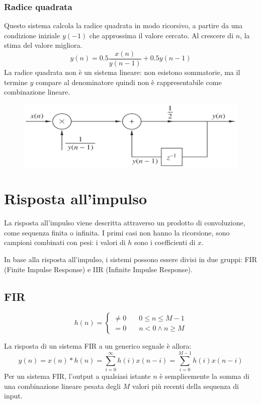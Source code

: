 \newpage
\subsubsection{Radice quadrata}
Questo sistema calcola la radice quadrata in modo ricorsivo, a partire da una condizione iniziale $y(-1)$ che approssima il valore cercato. Al crescere di $n$, la stima del valore migliora.
$$y(n) = 0.5 \frac{x(n)}{y(n-1)} + 0.5y(n-1)$$
La radice quadrata non è un sistema lineare: non esistono sommatorie, ma il termine $y$ compare al denominatore quindi non è rappresentabile come combinazione lineare. 

\begin{figure}[h]
	\centering
	\includegraphics[scale=0.3]{Lezioni/Immagini/radice}
\end{figure}

\section{Risposta all'impulso}
La risposta all'impulso viene descritta attraverso un prodotto di convoluzione, come sequenza finita o infinita. I primi casi non hanno la ricorsione, sono campioni combinati con pesi: i valori di $h$ sono i coefficienti di $x$.

In base alla risposta all'impulso, i sistemi possono essere divisi in due gruppi: FIR (Finite Impulse Response) e IIR (Infinite Impulse Response). 

\subsection{FIR}
$$h(n) = \begin{cases}
\neq 0 & \quad 0 \leq n \leq M - 1 \\
= 0 & \quad n < 0 \land n \geq M
\end{cases}$$

La risposta di un sistema FIR a un generico segnale è allora:
$$y(n) = x(n) * h(n) = \sum_{i = 0}^{\infty} h(i)x(n - i) = \sum_{i = 0}^{M-1} h(i) x(n - i)$$
Per un sistema FIR, l'output a qualsiasi istante $n$ è semplicemente la somma di una combinazione lineare pesata degli $M$ valori più recenti della sequenza di input.

